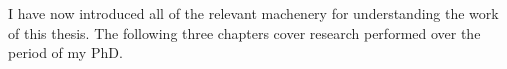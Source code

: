 


I have now introduced all of the relevant machenery for understanding the work of this thesis. The following three chapters cover research performed over the period of my PhD.
